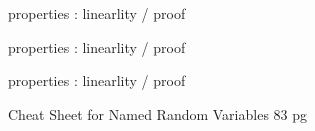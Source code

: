 \documentclass{beamer}
\begin{document}
properties : linearlity / proof




properties : linearlity / proof




properties : linearlity / proof







\begin{frame}{Cheat Sheet for Named Random Variables}
83 pg 
\end{frame}
    
\end{document}
